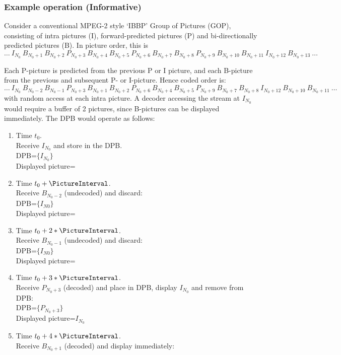 \begin{informative*}
\subsubsection{Example operation (Informative)}
Consider a conventional MPEG-2 style `IBBP' Group of Pictures (GOP), consisting
of intra pictures (I), forward-predicted pictures (P) and bi-directionally
predicted pictures (B). In picture order, this is
\[\ldots\ I_{N_0}\ B_{N_0+1}\ B_{N_0+2}\ P_{N_0+3}\ B_{N_0+4}\ B_{N_0+5}\ 
P_{N_0+6}\ B_{N_0+7}\ B_{N_0+8}\ P_{N_0+9}\ B_{N_0+10}\ B_{N_0+11}\ I_{N_0+12}
\ B_{N_0+13}\ \ldots\]

Each P-picture is predicted from the previous P or I picture, and each B-picture
from the previous and subsequent P- or I-picture. Hence coded order is:
\[\ldots\ I_{N_0}\ B_{N_0-2}\ B_{N_0-1}\ P_{N_0+3}\ B_{N_0+1}\ B_{N_0+2}\ 
P_{N_0+6}\ B_{N_0+4}\ B_{N_0+5}\ P_{N_0+9}\ B_{N_0+7}\ B_{N_0+8}\ I_{N_0+12} 
\ B_{N_0+10}\ B_{N_0+11}\ \ldots\]
with random access at each intra picture. A decoder accessing the stream at
$I_{N_0}$ would require a buffer of 2 pictures, since B-pictures can be
displayed immediately. The DPB would operate as follows:
\begin{enumerate}
\item Time $t_0$. \\
Receive $I_{N_0}$ and store in the DPB.\\
DPB=$\{I_{N_0}\}$\\
Displayed picture=
\item Time $t_0+\PictureInterval$. \\
Receive $B_{N_0-2}$ (undecoded) and discard:\\
DPB=$\{I_{N0}\}$\\
Displayed picture=
\item Time $t_0+2*\PictureInterval$. \\
Receive $B_{N_0-1}$ (undecoded) and discard:\\
DPB=$\{I_{N0}\}$\\
Displayed picture=
\item Time $t_0+3*\PictureInterval$. \\
Receive $P_{N_0+3}$ (decoded) and place in DPB, 
display $I_{N_0}$ and remove from DPB:\\
DPB=$\{P_{N_0+3}\}$\\
Displayed picture=$I_{N_0}$
\item Time $t_0+4*\PictureInterval$. \\
Receive $B_{N_0+1}$ (decoded) and display immediately:\\

\end{enumerate}
\end{informative*}
